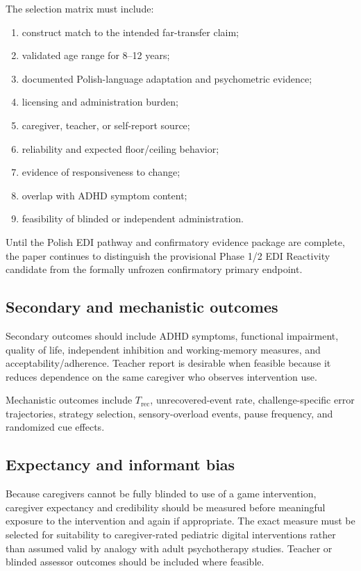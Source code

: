 The selection matrix must include:

\begin{enumerate}
\item construct match to the intended far-transfer claim;
\item validated age range for 8--12 years;
\item documented Polish-language adaptation and psychometric evidence;
\item licensing and administration burden;
\item caregiver, teacher, or self-report source;
\item reliability and expected floor/ceiling behavior;
\item evidence of responsiveness to change;
\item overlap with ADHD symptom content;
\item feasibility of blinded or independent administration.
\end{enumerate}

Until the Polish EDI pathway and confirmatory evidence package are complete, the paper continues to distinguish the provisional Phase 1/2 EDI Reactivity candidate from the formally unfrozen confirmatory primary endpoint.

\subsection{Secondary and mechanistic outcomes}

Secondary outcomes should include ADHD symptoms, functional impairment, quality of life, independent inhibition and working-memory measures, and acceptability/adherence. Teacher report is desirable when feasible because it reduces dependence on the same caregiver who observes intervention use.

Mechanistic outcomes include \(T_{\mathrm{rec}}\), unrecovered-event rate, challenge-specific error trajectories, strategy selection, sensory-overload events, pause frequency, and randomized cue effects.

\subsection{Expectancy and informant bias}

Because caregivers cannot be fully blinded to use of a game intervention, caregiver expectancy and credibility should be measured before meaningful exposure to the intervention and again if appropriate. The exact measure must be selected for suitability to caregiver-rated pediatric digital interventions rather than assumed valid by analogy with adult psychotherapy studies. Teacher or blinded assessor outcomes should be included where feasible.
